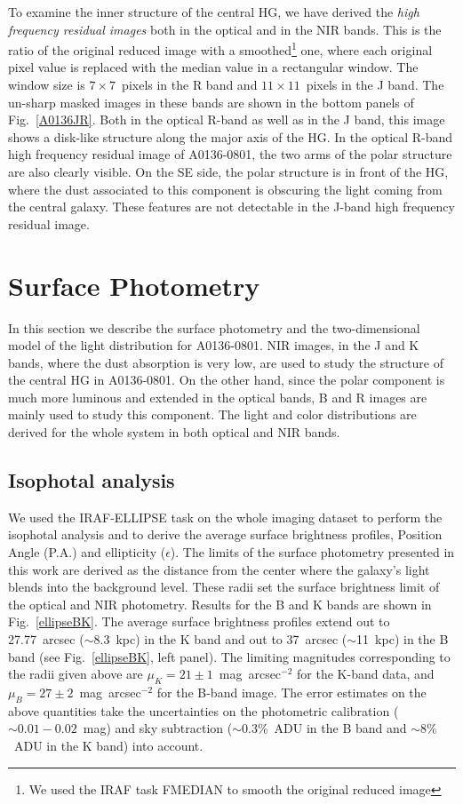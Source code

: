 \documentclass[useAMS,usenatbib]{mn2e}
\begin{document}
To examine the inner structure of the central HG, we have derived the
{\it high frequency residual images} both in the optical and in the
NIR bands. This is the ratio of the original reduced image with a
smoothed\footnote{We used the IRAF task {\small FMEDIAN} to smooth the
  original reduced image} one, where each original pixel value is
replaced with the median value in a rectangular window. The window
size is $7\times 7$~pixels in the R band and $11\times 11$~pixels in
the J band. The un-sharp masked images in these bands are shown in the
bottom panels of Fig.~\ref{A0136JR}.
%
Both in the optical R-band as well as in the J band, this image shows a
disk-like structure along the major axis of the HG. In the optical
R-band high frequency residual image of A0136-0801, the two arms of
the polar structure are also clearly visible. On the SE side, the
polar structure is in front of the HG, where the dust associated to
this component is obscuring the light coming from the central
galaxy. These features are not detectable in the J-band high frequency
residual image.



\section{Surface Photometry}\label{phot}

In this section we describe the surface photometry and the
two-dimensional model of the light distribution for A0136-0801.  NIR
images, in the J and K bands, where the dust absorption is very low,
are used to study the structure of the central HG in A0136-0801. On
the other hand, since the polar component is much more luminous and
extended in the optical bands, B and R images are mainly used to study
this component. The light and color distributions are
derived for the whole system in both optical and NIR bands.

\subsection{Isophotal analysis}

We used the {\small IRAF-ELLIPSE} task on the whole imaging dataset
to perform the isophotal analysis and to derive the
average surface brightness profiles, Position Angle (P.A.) and
ellipticity ($\epsilon$).  
The limits of the surface photometry presented in this work are 
derived as the distance from the center where the galaxy's light
blends into the background level. These radii
set the surface brightness limit of the optical and NIR photometry. 
Results for the B and K bands are shown in Fig.~\ref{ellipseBK}.
The average surface brightness profiles extend out to 27.77~arcsec
($\sim$8.3~kpc) in the K band and out to 37~arcsec ($\sim$11~kpc) in
the B band (see Fig.~\ref{ellipseBK}, left panel). 
The limiting magnitudes corresponding to the radii given above are $\mu_{K} = 21 \pm 1$~mag~arcsec$^{-2}$ for the
K-band data, and $\mu_B = 27 \pm 2$~mag~arcsec$^{-2}$ for the B-band
image. The error estimates on the above quantities take the
uncertainties on the photometric calibration ($\sim0.01-0.02$~mag) and
sky subtraction ($\sim 0.3\%$~ADU in the B band and $\sim 8\%$~ADU in
the K band) into account.
\end{document}
